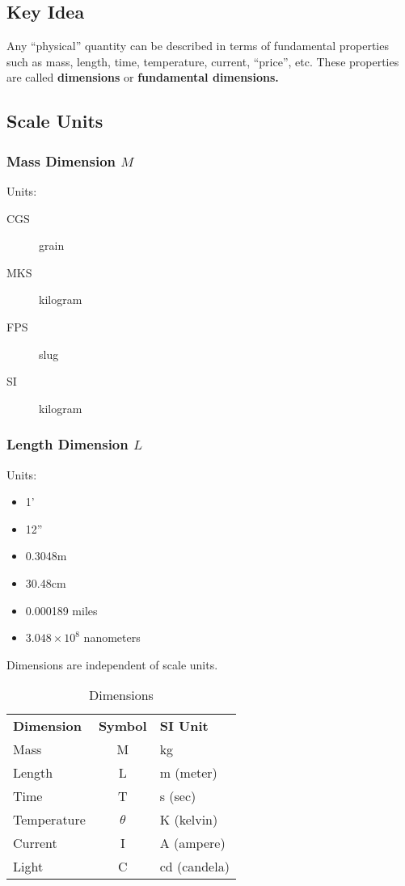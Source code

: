\documentclass[
	date={August 21{,} 2024}
]{math486notes}
\begin{document}
\subsection{Key Idea}\label{subsec:key-idea}
Any ``physical'' quantity can be described in terms of fundamental properties such as mass, length, time, temperature, current, ``price'', etc.
These properties are called \textbf{dimensions} or \textbf{fundamental dimensions.}

\subsection{Scale Units}\label{subsec:scale-units}

\subsubsection{Mass Dimension $M$}\label{subsubsec:mass-dimension-$m$}
Units:
\begin{description}
	\item[CGS] grain
	\item[MKS] kilogram
	\item[FPS] slug
	\item[SI] kilogram
\end{description}

\subsubsection{Length Dimension $L$}\label{subsubsec:length-dimension-$l$}
Units:
\begin{itemize}
	\item 1'
	\item 12''
	\item 0.3048m
	\item 30.48cm
	\item 0.000189 miles
	\item $3.048\times10^{8}$ nanometers
\end{itemize}

\noindent Dimensions are independent of scale units.

\noindent {}

\begin{table}[H]
	\centering
	\caption{Dimensions}
	\label{tab:dimensions}
	\begin{tabular}{lcl}
		\textbf{Dimension} & \textbf{Symbol} & \textbf{SI Unit}\\
		Mass & M & kg\\
		Length & L & m (meter)\\
		Time & T & s (sec)\\
		Temperature & $\theta$ & K (kelvin)\\
		Current & I & A (ampere)\\
		Light & C & cd (candela)
	\end{tabular}
\end{table}
\end{document}
